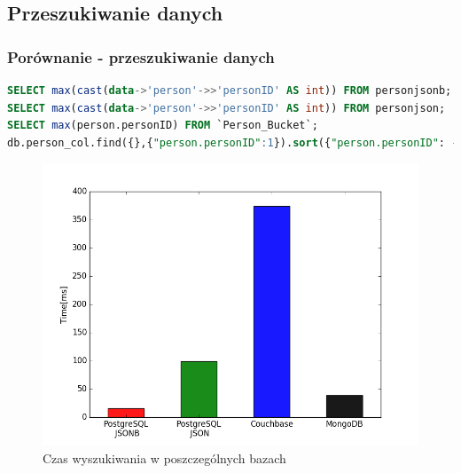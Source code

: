\documentclass{beamer}
\begin{document}
\begin{frame}[fragile]
\subsection{Przeszukiwanie danych}
\frametitle{Porównanie - przeszukiwanie danych}
\begin{lstlisting}[language=SQL,basicstyle=\tiny]
SELECT max(cast(data->'person'->>'personID' AS int)) FROM personjsonb;
SELECT max(cast(data->'person'->>'personID' AS int)) FROM personjson;
SELECT max(person.personID) FROM `Person_Bucket`;
db.person_col.find({},{"person.personID":1}).sort({"person.personID": -1}).limit(1)
\end{lstlisting}
\begin{figure}[h]
\begin{center}
\includegraphics[scale=0.37]{ax/fig1}
\end{center}
\caption{Czas wyszukiwania w poszczególnych bazach}
\end{figure}

\end{frame}
\end{document}

